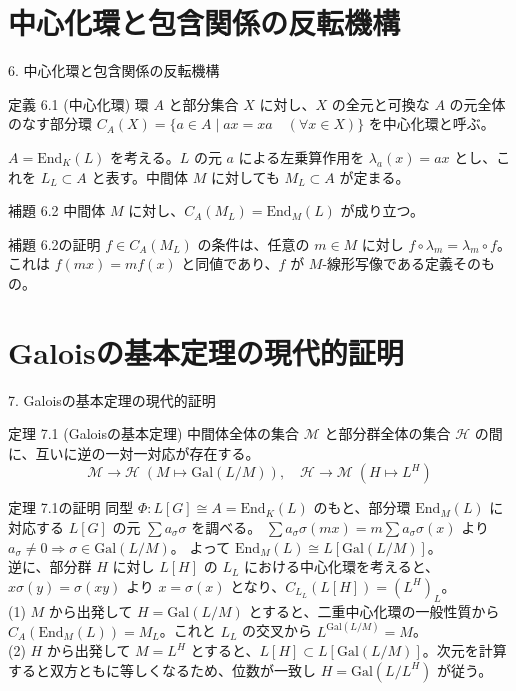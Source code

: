 \documentclass[11pt]{beamer}
\begin{document}
\section{中心化環と包含関係の反転機構}
\begin{frame}[allowframebreaks]{6. 中心化環と包含関係の反転機構}
    \begin{block}{定義 6.1 (中心化環)}
        環 $A$ と部分集合 $X$ に対し、$X$ の全元と可換な $A$ の元全体のなす部分環 $C_A(X) = \{ a \in A \mid ax = xa \quad (\forall x \in X) \}$ を中心化環と呼ぶ。
    \end{block}

    $A = \mathrm{End}_K(L)$ を考える。$L$ の元 $a$ による左乗算作用を $\lambda_a(x) = ax$ とし、これを $L_L \subset A$ と表す。中間体 $M$ に対しても $M_L \subset A$ が定まる。

    \begin{block}{補題 6.2}
        中間体 $M$ に対し、$C_A(M_L) = \mathrm{End}_M(L)$ が成り立つ。
    \end{block}
    \begin{block}{補題 6.2の証明}
        $f \in C_A(M_L)$ の条件は、任意の $m \in M$ に対し $f \circ \lambda_m = \lambda_m \circ f$。これは $f(mx) = mf(x)$ と同値であり、$f$ が $M$-線形写像である定義そのもの。
    \end{block}
\end{frame}

\section{Galoisの基本定理の現代的証明}
\begin{frame}[allowframebreaks]{7. Galoisの基本定理の現代的証明}
    \begin{block}{定理 7.1 (Galoisの基本定理)}
        中間体全体の集合 $\mathcal{M}$ と部分群全体の集合 $\mathcal{H}$ の間に、互いに逆の一対一対応が存在する。
        \[ \mathcal{M} \longrightarrow \mathcal{H} \; (M \mapsto \mathrm{Gal}(L/M)), \quad \mathcal{H} \longrightarrow \mathcal{M} \; (H \mapsto L^H) \]
    \end{block}
    \begin{block}{定理 7.1の証明}
        同型 $\Phi: L[G] \cong A = \mathrm{End}_K(L)$ のもと、部分環 $\mathrm{End}_M(L)$ に対応する $L[G]$ の元 $\sum a_\sigma \sigma$ を調べる。
        $\sum a_\sigma \sigma(mx) = m \sum a_\sigma \sigma(x)$ より $a_\sigma \neq 0 \Rightarrow \sigma \in \mathrm{Gal}(L/M)$。
        よって $\mathrm{End}_M(L) \cong L[\mathrm{Gal}(L/M)]$。\\
        逆に、部分群 $H$ に対し $L[H]$ の $L_L$ における中心化環を考えると、$x\sigma(y) = \sigma(xy)$ より $x = \sigma(x)$ となり、$C_{L_L}(L[H]) = (L^H)_L$。\\
        (1) $M$ から出発して $H = \mathrm{Gal}(L/M)$ とすると、二重中心化環の一般性質から $C_A(\mathrm{End}_M(L)) = M_L$。これと $L_L$ の交叉から $L^{\mathrm{Gal}(L/M)} = M$。\\
        (2) $H$ から出発して $M = L^H$ とすると、$L[H] \subset L[\mathrm{Gal}(L/M)]$。次元を計算すると双方ともに等しくなるため、位数が一致し $H = \mathrm{Gal}(L/L^H)$ が従う。
    \end{block}
\end{frame}
\end{document}
